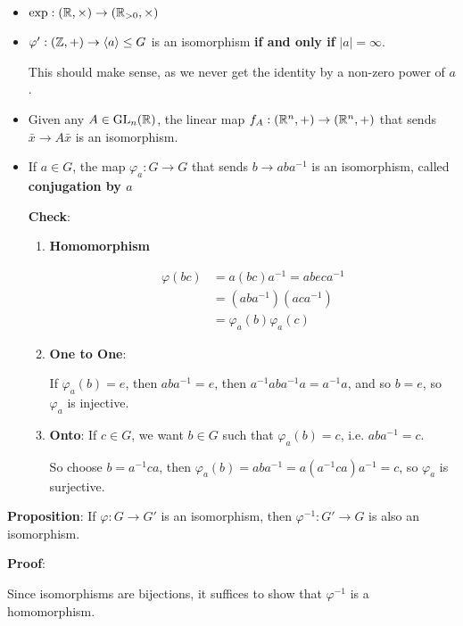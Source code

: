 \documentclass[12pt]{article}
\def\phi{\varphi}
\newcommand{\lr}[1]{\langle #1 \rangle}
\def\gl{\text{GL}}
\begin{document}
\begin{itemize}
	\item $\exp: ({\mathbb R}, \times) \to ({\mathbb R}_{> 0}, \times)$
	\item $\phi': (\Z, +) \to \lr {a} \le G$ is an isomorphism {\bf if and only
			      if} $|a| = \infty$.

	      This should make sense, as we never get the identity by a non-zero power of
	      $a$.

	\item Given any $A \in \gl_n(\R)$, the linear map $f_A: ({\mathbb R}^n, +) \to ({\mathbb R}^n,
		      +)$ that sends $\bar x \to A \bar x$ is an isomorphism.

	\item If $a \in G$, the map $\phi_a: G \to G$ that sends $b \to aba^{-1}$ is
	      an isomorphism, called {\bf conjugation by $a$}

		      {\bf Check}:

	      \begin{enumerate}
		      \item {\bf Homomorphism}

		            \begin{align*}
			            \phi(bc) & = a(bc)a^{-1} = abeca^{-1} \\
			                     & = (aba^{-1})(aca^{-1})     \\
			                     & = \phi_a(b)\phi_a(c)
		            \end{align*}

		      \item {\bf One to One}:

		            If $\phi_a(b) = e$, then $aba^{-1} = e$, then $a^{-1}aba^{-1}a =
			            a^{-1}a$, and so $b = e$, so $\phi_a$ is injective.

		      \item {\bf Onto}:
		            If $c \in G$, we want $b \in G$ such that $\phi_a(b) = c$, i.e.
		            $aba^{-1} = c$.

		            So choose $b = a^{-1}ca$, then $\phi_a(b) = aba^{-1} = a(a^{-1}ca)a^{-1}
			            = c$, so $\phi_a$ is surjective.
	      \end{enumerate}
\end{itemize}

{\bf Proposition}: If $\phi: G \to G'$ is an isomorphism, then $\phi^{-1}: G'
	\to G$ is also an isomorphism.

	{\bf Proof}:

Since isomorphisms are bijections, it suffices to show that $\phi^{-1}$ is a homomorphism.
\end{document}
